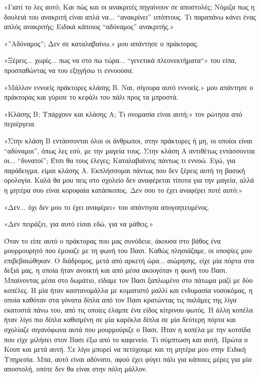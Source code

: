 \documentclass[12pt,twoside, openany]{book}
\begin{document}
«Γιατί το λες αυτό; Και πώς και οι ανακριτές πηγαίνουν σε αποστολές; Νόμιζα πως η δουλειά του ανακριτή είναι απλά να... “ανακρίνει” υπόπτους. Τι παραπάνω κάνει ένας απλός ανακριτής; Ειδικά κάποιος “αδύναμος” ανακριτής.»

«”Αδύναμος”; Δεν σε καταλαβαίνω.» μου απάντησε ο πράκτορας.

«Ξέρεις... χωρίς... πως να στο πω τώρα... “γενετικά πλεονεκτήματα“» του είπα, προσπαθώντας να του εξηγήσω τι εννοούσα.

«Μάλλον εννοείς πράκτορες κλάσης Β. Ναι, σίγουρα αυτό εννοείς.» μου απάντησε ο πράκτορας και γύρισε το κεφάλι του πάλι προς τα μπροστά.

«Κλάσης Β; Υπάρχουν και κλάσης Α; Τι ονομασία είναι αυτή;» τον ρώτησα από περιέργεια.

«Στην κλάση Β εντάσσονται όλοι οι άνθρωποι, στην πράκτορες ή μη, οι οποίοι είναι “αδύναμοι”, όπως λες εσύ, με την μαγεία τους. Στην κλάση Α αντιθέτως εντάσσονται οι... “δυνατοί”; Έτσι θα τους έλεγες; Καταλαβαίνεις πάντως τι εννοώ. Εγώ, για παράδειγμα, είμαι κλάσης Α. Εκπλήσσομαι πάντως που δεν ξέρεις αυτή τη βασική ορολογία. Καλά θα μου πεις στο σχολείο δεν αναφέρεται τίποτα για την μαγεία, αλλά η μητέρα σου είναι κορυφαία κατάσκοπος. Δεν σου το έχει αναφέρει ποτέ αυτό;»

«Δεν... όχι δεν μου το έχει αναφέρει» του απάντησα απογοητευμένος.

«Δεν πειράζει, για αυτό είσαι εδώ, για να μάθεις.»

Όταν το είπε αυτό ο πράκτορας που μας συνόδευε, άκουσα στο βάθος ένα μουρμουρητό που έμοιαζε με τη φωνή του Βασι. Καθώς πλησιάζαμε, οι υποψίες μου επιβεβαιώθηκαν. Ο διάδρομος, μετά από αρκετή ώρα... αιώρησης, είχε μία πόρτα στα δεξιά μας, η οποία ήταν ανοικτή και από μέσα ακουγόταν η φωνή του Βασι. Μπαίνοντας μέσα στο δωμάτιο, είδαμε τον Βασι ξαπλωμένο στο πάτωμα μαζί με δύο κοπέλες. Η μία ήταν καστανομάλλα με κυματιστό μαλλί και ενδυμασία νοσοκόμας, η οποία καθόταν στα γόνατα δίπλα από τον Βασι κρατώντας τις παλάμες της λίγα εκατοστά πάνω του, από τις οποίες έλαμπε ένα είδος κίτρινου φωτός. Η άλλη κοπέλα ήταν λίγο πιο δίπλα καθισμένη σε μία καρέκλα δίπλα σε μία δεύτερη πόρτα και σχολίαζε σιγανόφωνα αυτά που μουρμούριζε ο Βασι. Ήταν η κοπέλα με την κοτσίδα που είχε μιλήσει στον Βασι έξω από το καφενείο. Τι σύμπτωση και αυτή. Πρώτα ο Κουπ και μετά αυτή. Σε λίγο μπορεί να πετύχουμε και τη μητέρα μου στην Ειδική Υπηρεσία. Μπα, αυτό είναι αδύνατο, αφού έχει φύγει πάλι για κάποιες μέρες για μία αποστολή, οπότε δεν θα είναι στην πόλη μάλλον.
\end{document}
